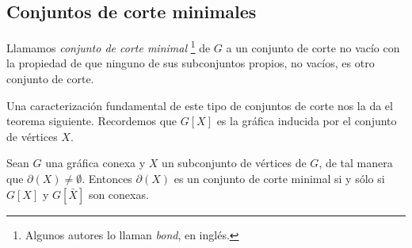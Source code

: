 \subsection{Conjuntos de corte minimales}

Llamamos \textit{conjunto de corte minimal} \footnote{Algunos autores lo llaman \textit{bond}, en inglés.} de $G$ a un conjunto de corte no vacío con la propiedad de que ninguno de sus subconjuntos propios, no vacíos, es otro conjunto de corte. 

Una caracterización fundamental de este tipo de conjuntos de corte nos la da el teorema siguiente. Recordemos que $G[X]$ es la gráfica inducida por el conjunto de vértices $X$.

\begin{teo} \label{teo:caracterizacionbond}
Sean $G$ una gráfica conexa y $X$ un subconjunto de vértices de $G$, de tal manera que $\partial(X) \neq \emptyset$. Entonces $\partial(X)$ es un conjunto de corte minimal si y sólo si $G[X]$ y $G[\bar{X}]$ son conexas. 
\end{teo}

